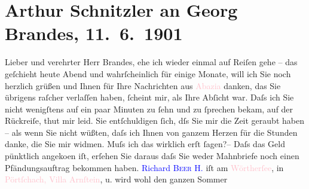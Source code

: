 

               \section[Arthur Schnitzler an Georg Brandes, 11. 6. 1901]{ Arthur Schnitzler an Georg Brandes, 11. 6. 1901}\nopagebreak{}\rehead{ }\normalsize\beginnumbering{} \toendnotes[C]{\smallbreak\pagebreak[2]} 
\toendnotes[C]{\smallbreak}\pstart{}{\pb}Lieber und verehrter Herr
                        Brandes,\pend\pstart
           ehe ich wieder einmal auf Reiſen gehe – das geſchieht heute Abend und
                    wahrſcheinlich für einige Monate, will ich Sie noch herzlich grüßen und Ihnen
                    für Ihre Nachrichten aus \textcolor{pink}{Abazia}{}\ledrightnote{\textcolor{pink}{Hotel Guarnero}} danken, das Sie
                    übrigens raſcher verlaſſen haben, ſcheint mir, als Ihre Abſicht war. Daſs ich
                    Sie {\pb}nicht wenigſtens auf ein paar
                    Minuten zu ſehn und zu ſprechen bekam, auf der Rückreiſe, thut mir leid. Sie
                    entſchuldigen ſich, dſs Sie mir die Zeit geraubt haben – als wenn Sie nicht
                    wüßten, daſs ich Ihnen von ganzem Herzen für die Stunden danke, die Sie mir
                    widmen. Muſs ich das wirklich erſt ſagen?– Daſs das Geld pünktlich angeko{\geminationm}en iſt, erſehen Sie daraus {\pb}daſs Sie weder Mahnbriefe noch einen
                    Pfändungsauftrag bekommen haben. \textcolor{blue}{Richard \textsc{Beer H.}}{}\ledrightnote{\textcolor{blue}{Richard Beer-Hofmann}} iſt am \textcolor{pink}{Wörtherſee}{}\ledrightnote{\textcolor{pink}{Wörthersee}}, in \textcolor{pink}{Pörtſchach, Villa Arnſtein}{}\ledrightnote{\textcolor{pink}{Villa Arnstein}}, u. wird wohl den ganzen Sommer
